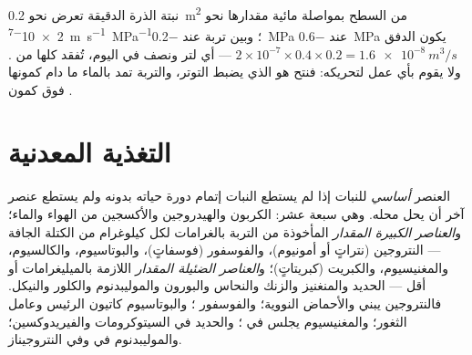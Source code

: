\begin{example}\label{ex:b1:plant-water-minerals:litre}
 نبتة الذرة الدقيقة تعرض نحو \qty{0.2}{m^2} من السطح بمواصلة
مائية مقدارها نحو \qty{2e-7}{m.s^{-1}.MPa^{-1}}؛ وبين تربة عند
\qty{-0.2}{MPa}   عند \qty{-0.6}{MPa} يكون الدفق
$2\times 10^{-7}\times 0.4\times 0.2 = \qty{1.6e-8}{m^3/s}$ --- أي
لتر ونصف في اليوم، تُفقد كلها من . ولا يقوم  بأي عمل
لتحريكه: فنتح  هو الذي يضبط التوتر، والتربة تمد بالماء ما دام
كمونها فوق كمون .
\end{example}

\section{التغذية المعدنية}

\begin{definition}\label{def:b1:plant-water-minerals:elements}
العنصر \emph{أساسي} للنبات إذا لم يستطع النبات إتمام دورة حياته
بدونه ولم يستطع عنصر آخر أن يحل محله. وهي سبعة عشر: الكربون
والهيدروجين والأكسجين من الهواء والماء؛ و\emph{العناصر الكبيرة
المقدار} المأخوذة من التربة بالغرامات لكل كيلوغرام من الكتلة الجافة
--- النتروجين (نتراتٍ أو أمونيوم)، والفوسفور (فوسفاتٍ)،
والبوتاسيوم، والكالسيوم، والمغنيسيوم، والكبريت (كبريتاتٍ)؛
و\emph{العناصر الضئيلة المقدار} اللازمة بالميليغرامات أو أقل ---
الحديد والمنغنيز والزنك والنحاس والبورون والموليبدنوم والكلور
والنيكل. فالنتروجين يبني  والأحماض النووية؛ والفوسفور
 ؛ والبوتاسيوم كاتيون  الرئيس وعامل
 الثغور؛ والمغنيسيوم يجلس في ؛ والحديد في السيتوكرومات
والفيريدوكسين؛ والموليبدنوم في  وفي النتروجيناز.
\end{definition}

